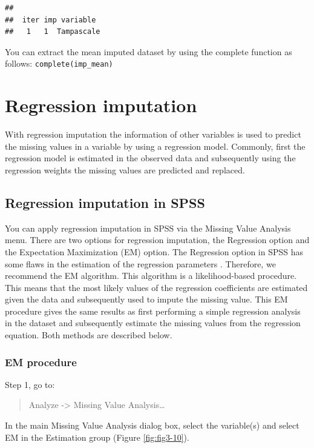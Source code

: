 \documentclass[]{book}
\begin{document}
\begin{verbatim}
## 
##  iter imp variable
##   1   1  Tampascale
\end{verbatim}

You can extract the mean imputed dataset by using the complete function
as follows: \texttt{complete(imp\_mean)}

\section{Regression imputation}\label{regression-imputation}

With regression imputation the information of other variables is used to
predict the missing values in a variable by using a regression model.
Commonly, first the regression model is estimated in the observed data
and subsequently using the regression weights the missing values are
predicted and replaced.

\subsection{Regression imputation in
SPSS}\label{regression-imputation-in-spss}

You can apply regression imputation in SPSS via the Missing Value
Analysis menu. There are two options for regression imputation, the
Regression option and the Expectation Maximization (EM) option. The
Regression option in SPSS has some flaws in the estimation of the
regression parameters \citep{hippel2004}. Therefore, we recommend the EM
algorithm. This algorithm is a likelihood-based procedure. This means
that the most likely values of the regression coefficients are estimated
given the data and subsequently used to impute the missing value. This
EM procedure gives the same results as first performing a simple
regression analysis in the dataset and subsequently estimate the missing
values from the regression equation. Both methods are described below.

\subsubsection{EM procedure}\label{em-procedure}

Step 1, go to:

\begin{quote}
Analyze -\textgreater{} Missing Value Analysis\ldots{}
\end{quote}

In the main Missing Value Analysis dialog box, select the variable(s)
and select EM in the Estimation group (Figure \ref{fig:fig3-10}).
\end{document}
